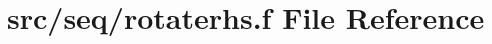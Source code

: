 \hypertarget{seq_2rotaterhs_8f}{\section{src/seq/rotaterhs.f File Reference}
\label{seq_2rotaterhs_8f}
}
